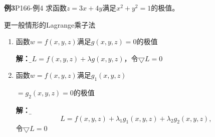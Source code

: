 \begin{frame}
	\linespread{1.2}
	\begin{exampleblock}{{\bf 例3}\hfill P166-例4}
		求函数$z=3x+4y$满足$x^2+y^2=1$的极值。\pause 
	\end{exampleblock}
	\vspace{-1em}
	\begin{center}
	\end{center}
\end{frame}

\begin{frame}{更一般情形的Lagrange乘子法}
	\linespread{1.2}\pause 
	\begin{enumerate}
	  \item {}\pause 函数$w=f(x,y,z)$满足$g(x,y,z)=0$的极值\pause 
	  
	  {\bf 解：}{\b 记$L=f(x,y,z)+\lambda g(x,y,z)$，令$\bigtriangledown L=0$}\pause 
	  \item {}\pause 函数$w=f(x,y,z)$满足$g_1(x,y,z)$
	  
	  $=g_2(x,y,z)=0$的极值\pause 
	  
	  {\bf 解：}{\b 记
	  \vspace{-1em}
	  $$L=f(x,y,z)+\lambda_1 g_1(x,y,z)+\lambda_2 g_2(x,y,z),$$
	  \vspace{-1em}
	  令$\bigtriangledown L=0$}
	\end{enumerate}
\end{frame}

